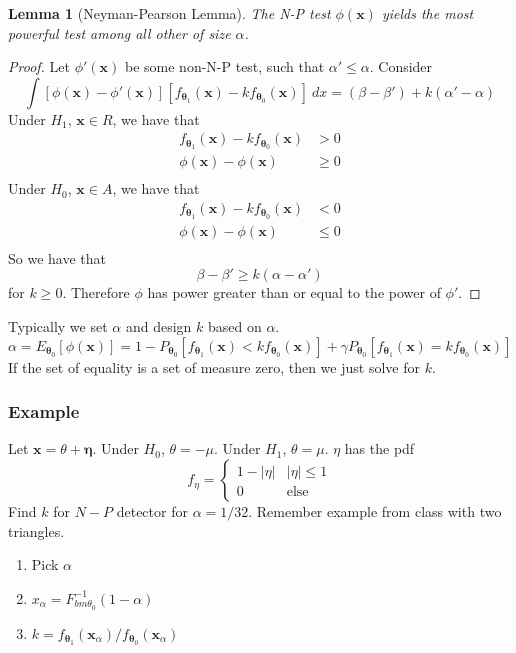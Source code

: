 \documentclass[a4paper]{article}
\newtheorem*{lem}{Lemma}
\begin{document}
\begin{lem}[Neyman-Pearson Lemma]
  The N-P test $\phi(\bm{x})$ yields the most powerful test among all other of size $\alpha$. 
\end{lem}

\begin{proof}
  Let $\phi'(\bm{x})$ be some non-N-P test, such that $\alpha' \leq \alpha$. Consider 
  \[
    \int [\phi(\bm{x}) - \phi'(\bm{x})][f_{\bm{\theta}_1}(\bm{x}) - kf_{\bm{\theta}_0}(\bm{x})] \ dx = (\beta - \beta') + k(\alpha' - \alpha)
  \]
  Under $H_1$, $\bm{x} \in R$, we have that
  \[
    \begin{aligned}
      f_{\bm{\theta}_1} (\bm{x}) - k f_{\bm{\theta}_0} (\bm{x})  &> 0 \\
      \phi(\bm{x}) - \phi(\bm{x})  &\geq 0 \\
    \end{aligned}
  \]
  Under $H_0$, $\bm{x} \in A$, we have that
  \[
    \begin{aligned}
       f_{\bm{\theta}_1} (\bm{x}) - k f_{\bm{\theta}_0} (\bm{x})  &< 0 \\
       \phi(\bm{x}) - \phi(\bm{x})  &\leq 0 \\
    \end{aligned}
  \]
  So we have that
  \[
    \beta - \beta' \geq k(\alpha - \alpha')
  \]
  for $k \geq 0$. Therefore $\phi$ has power greater than or equal to the power of $\phi'$.
\end{proof}
Typically we set $\alpha$ and design $k$ based on $\alpha$.
\[
  \alpha = E_{\bm{\theta}_0} [\phi(\bm{x})] = 1 - P_{\bm{\theta}_0}[f_{\bm{\theta}_1}(\bm{x}) < k f_{\bm{\theta}_0}(\bm{x})] + \gamma P_{\bm{\theta}_0}[f_{\bm{\theta}_1}(\bm{x}) = k f_{\bm{\theta}_0}(\bm{x})]
\]
If the set of equality is a set of measure zero, then we just solve for $k$.

\subsubsection*{Example}%
Let $\bm{x} = \theta + \bm{\eta}$.  Under $H_0$, $\theta = -\mu$. Under $H_1$, $\theta = \mu$. $\eta$ has the pdf
\[
  f_{\eta} = 
  \begin{cases}
    1 - |\eta| & |\eta| \leq 1 \\
    0 & \text{else}
  \end{cases}
\]
Find $k$ for $N-P$ detector for $\alpha = 1/32$. Remember example from class with two triangles.

\begin{enumerate}
  \item Pick $\alpha$
  \item $x_{\alpha} = F^{-1}_{bm{\theta}_0}(1 - \alpha)$
  \item $k = f_{\bm{\theta}_1}(\bm{x}_{\alpha})/f_{\bm{\theta}_0}(\bm{x}_{\alpha})$
\end{enumerate}
\end{document}
